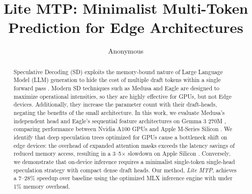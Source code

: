 \documentclass{article} %
\title{Lite MTP: Minimalist Multi-Token Prediction for Edge Architectures}
\author{Anonymous}
\begin{document}
\maketitle

\begin{abstract}
Speculative Decoding (SD) exploits the memory-bound nature of Large Language Model (LLM) generation to hide the cost of multiple draft tokens within a single forward pass \citep{leviathan2023fast, chen2023accelerating}. Modern SD techniques such as Medusa and Eagle are designed to maximize operational intensities, so they are highly effective for GPUs, but not Edge devices\citep{cai2024medusa, li2024eagle}. Additionally, they increase the parameter count with their draft-heads, negating the benefits of the small architecture. In this work, we evaluate Medusa's independent head and Eagle's sequential feature architectures on Gemma 3 270M \citep{google2024gemma}, comparing performance between Nvidia A100 GPUs and Apple M-Series Silicon \citep{apple2024m4}. We identify that deep speculation trees optimized for GPUs \citep{miao2024specinfer} cause a bottleneck shift on edge devices: the overhead of expanded attention masks exceeds the latency savings of reduced memory access, resulting in a 3--5$\times$ slowdown on Apple Silicon \citep{williams2009roofline}. Conversely, we demonstrate that on-device inference requires a minimalist single-token single-head speculation strategy with compact dense draft heads. Our method, \textit{Lite MTP}, achieves a 7--28\% speedup over baseline using the optimized MLX inference engine\citep{hannun2023mlx} with under 1\% memory overhead.
\end{abstract}
\end{document}
